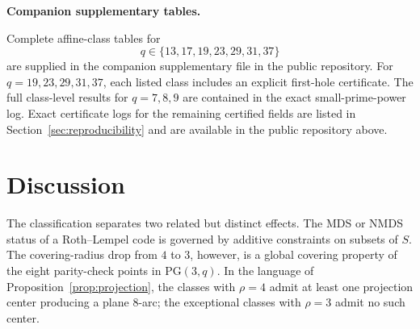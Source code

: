 \documentclass[11pt]{article}
\newcommand{\PG}{\mathrm{PG}}
\theoremstyle{plain}
\theoremstyle{definition}
\begin{document}
\noindent\textbf{Companion supplementary tables.}
\begin{sloppypar}
Complete affine-class tables for
\[
q\in\{13,17,19,23,29,31,37\}
\]
are supplied in the companion supplementary file in the public
repository.  For \(q=19,23,29,31,37\), each listed class includes an explicit
first-hole certificate.  The full class-level results for \(q=7,8,9\) are
contained in the exact small-prime-power log.  Exact certificate logs for
the remaining certified fields are listed in Section~\ref{sec:reproducibility}
and are available in the public repository above.
\end{sloppypar}


\section{Discussion}

The classification separates two related but distinct effects.  The MDS or
NMDS status of a Roth--Lempel code is governed by additive constraints on
subsets of \(S\).  The covering-radius drop from \(4\) to \(3\), however, is a
global covering property of the eight parity-check points in \(\PG(3,q)\).
In the language of Proposition~\ref{prop:projection}, the classes with
\(\rho=4\) admit at least one projection center producing a plane \(8\)-arc;
the exceptional classes with \(\rho=3\) admit no such center.
\end{document}
